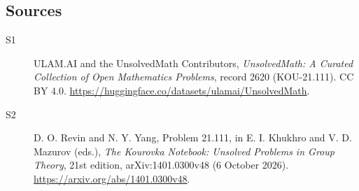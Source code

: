 \documentclass[11pt]{article}
\begin{document}
\subsection{Sources}
\begin{description}
\item[\hypertarget{source:2620:1}{S1}] ULAM.AI and the UnsolvedMath Contributors, \emph{UnsolvedMath: A Curated Collection of Open Mathematics Problems}, record 2620 (KOU-21.111). CC BY 4.0. \url{https://huggingface.co/datasets/ulamai/UnsolvedMath}.
\item[\hypertarget{source:2620:2}{S2}] D. O. Revin and N. Y. Yang, Problem 21.111, in E. I. Khukhro and V. D. Mazurov (eds.), \emph{The Kourovka Notebook: Unsolved Problems in Group Theory}, 21st edition, arXiv:1401.0300v48 (6 October 2026). \url{https://arxiv.org/abs/1401.0300v48}.
\end{description}
\label{end:2620}
\end{document}
